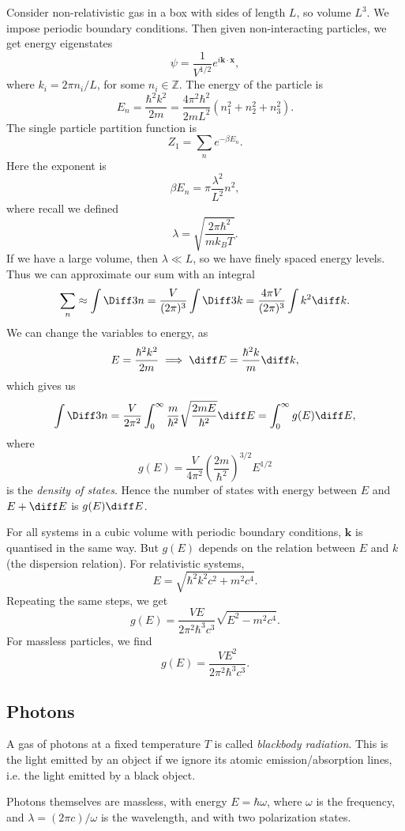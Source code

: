 \documentclass[12pt]{article}
\begin{document}
Consider non-relativistic gas in a box with sides of length $L$, so volume $L^3$. We impose periodic boundary conditions. Then given non-interacting particles, we get energy eigenstates
\[
\psi = \frac{1}{V^{1/2}} e^{i \mathbf{k} \cdot \mathbf{x}},
\]
where $k_i = 2 \pi n_i/L$, for some $n_i \in \mathbb{Z}$. The energy of the particle is
\[
E_n = \frac{\hbar^2 k^2}{2m} = \frac{4 \pi^2 \hbar^2}{2m L^2} (n_1^2 + n_2^2 + n_3^2).
\]
The single particle partition function is
\[
Z_1 = \sum_n e^{-\beta E_n}.
\]
Here the exponent is
\[
\beta E_n = \pi \frac{\lambda^2}{L^2} n^2,
\]
where recall we defined
\[
	\lambda = \sqrt{\frac{2 \pi \hbar^2}{m k_B T}}.
\]
If we have a large volume, then $\lambda \ll L$, so we have finely spaced energy levels. Thus we can approximate our sum with an integral
\[
\sum_n \approx \int \Diff3 n = \frac{V}{(2 \pi)^3} \int \Diff3 k = \frac{4 \pi V}{(2 \pi)^3} \int k^2 \diff k.
\]
We can change the variables to energy, as
\[
E = \frac{\hbar^2 k^2}{2m} \implies \diff E = \frac{\hbar^2 k}{m} \diff k,
\]
which gives us
\[
	\int \Diff 3n = \frac{V}{2\pi^2} \int_0^\infty \frac{m}{\hbar^2} \sqrt{\frac{2mE}{\hbar^2}} \diff E = \int_0^\infty g(E) \diff E,
\]
where
\[
g(E) = \frac{V}{4 \pi^2} \left(\frac{2m}{\hbar^2} \right)^{3/2} E^{1/2}
\]
is the \emph{density of states}. Hence the number of states with energy between $E$ and $E + \diff E$ is $g(E) \diff E$.

For all systems in a cubic volume with periodic boundary conditions, $\mathbf{k}$ is quantised in the same way. But $g(E)$ depends on the relation between $E$ and $k$ (the dispersion relation). For relativistic systems,
\[
	E = \sqrt{\hbar^2 k^2 c^2 + m^2 c^4}.
\]
Repeating the same steps, we get
\[
	g(E) = \frac{VE}{2\pi^2 \hbar^3 c^3} \sqrt{E^2 - m^2 c^4}.
\]
For massless particles, we find
\[
g(E) = \frac{VE^2}{2 \pi^2 \hbar^3 c^3}.
\]

\subsection{Photons}
\label{sub:phot}

A gas of photons at a fixed temperature $T$ is called \emph{blackbody radiation}. This is the light emitted by an object if we ignore its atomic emission/absorption lines, i.e. the light emitted by a black object.


Photons themselves are massless, with energy $E = \hbar\omega$, where $\omega$ is the frequency, and $\lambda = (2\pi c)/\omega$ is the wavelength, and with two polarization states.
\end{document}
